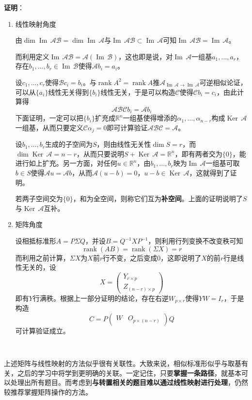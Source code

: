 \documentclass[a4paper,UTF8,fontset=windows]{ctexart}
\DeclareMathOperator{\rank}{rank}
\DeclareMathOperator{\im}{Im\,}
\DeclareMathOperator{\Ker}{Ker\,}
\newcommand*{\ma}{\mathcal{A}}
\newcommand*{\mb}{\mathcal{B}}
\newcommand*{\mc}{\mathcal{C}}
\newcommand*{\note}{\noindent *}
\begin{document}
\textbf{证明}：
\begin{enumerate}
    \item 线性映射角度
    
    由$\dim\im\ma\mb=\dim\im\ma$与$\im\ma\mb\subset\im\ma$可知$\im\ma\mb=\im\ma$。

    而利用定义$\im\ma\mb=\ma(\im\mb)$，这也即是说，对$\im\ma$一组基$a_1,\dots,a_r$，存在$b_1,\dots,b_r\in\im\mb$使得$\ma b_i=a_i$。

    设$c_1,\dots,c_r$使得$\mb c_i=b_i$。与$\rank A^2=\rank A$推$\ma_{\im\ma\to\im\ma}$可逆相似论证，可以从$\{a_i\}$线性无关得到$\{b_i\}$线性无关，于是可以构造$\mc$使得$\mc b_i=c_i$，由此计算得
    $$\ma\mb\mc b_i=\ma b_i$$
    下面证明，一定可以把$\{b_i\}$扩充成$\mathbb{R}^n$一组基使得增添的$\alpha_1,\dots,\alpha_{n-r}$构成$\Ker\ma$一组基，从而只要定义$\mc\alpha_j=0$即可计算验证$\ma\mb\mc=\ma$。

    设$b_1,\dots,b_r$生成的子空间为$S$，则由线性无关性$\dim S=r$，而$\dim\Ker\ma=n-r$，从而只要说明$S+\Ker\ma=\mathbb{R}^n$，即有两者交为$\{0\}$，能进行如上扩充。另一方面，对任何$u\in\mathbb{R}^n$，由$b_1,\dots,b_r$映为$\im\ma$一组基可取$b\in S$使得$\ma u=\ma b$，从而$\ma(u-b)=0$，$u-b\in\Ker\ma$，这就得到了证明。

    \note 若两子空间交为$\{0\}$，和为全空间，则称它们互为\textbf{补空间}。上面的证明说明了$S$与$\Ker\ma$互补。

    \item 矩阵角度
    
    设相抵标准形$A=P\Sigma Q$，并设$B=Q^{-1}XP^{-1}$，则利用行列变换不改变秩可知
    $$\rank(AB)=\rank(\Sigma X)=r$$
    而利用之前计算，$\Sigma X$为$X$前$r$行不变，之后变成0，这即说明了$X$的前$r$行是线性无关的，设
    $$X=\begin{pmatrix}Y_{r\times p}\\Z_{(n-r)\times p}\end{pmatrix}$$
    即有$Y$行满秩。根据上一部分证明的结论，存在右逆$W_{p\times r}$使得$YW=I_r$，于是构造
    $$C=P\begin{pmatrix}W&O_{p\times(n-r)}\end{pmatrix}Q$$
    可计算验证成立。
\end{enumerate}

\

\note 上述矩阵与线性映射的方法似乎很有关联性。大致来说，相似标准形似乎与取基有关，之后的学习中将学到更明确的关联。一定记住，只要\textbf{掌握一条路径}，就基本可以处理出所有题目。而考虑到\textbf{与转置相关的题目难以通过线性映射进行处理}，仍然较推荐掌握矩阵操作的方法。
\end{document}
